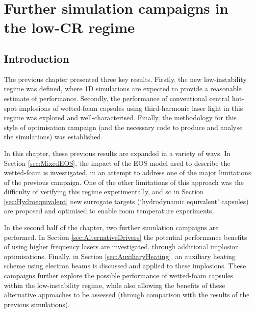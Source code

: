 

\chapter{\label{ch-FurtherSims} Further simulation campaigns in the low-CR regime}

\minitoc

\section{Introduction}
The previous chapter presented three key results. Firstly, the new low-instability regime was defined, where 1D simulations are expected to provide a reasonable estimate of performance. Secondly, the performance of conventional central hot-spot implosions of wetted-foam capsules using third-harmonic laser light in this regime was explored and well-characterised. Finally, the methodology for this style of optimisation campaign (and the necessary code to produce and analyse the simulations) was established.

In this chapter, these previous results are expanded in a variety of ways.  In Section \ref{sec:MixedEOS}, the impact of the EOS model used to describe the wetted-foam is investigated, in an attempt to address one of the major limitations of the previous campaign. One of the other limitations of this approach was the difficulty of verifying this regime experimentally, and so in Section \ref{sec:Hydroequivalent} new surrogate targets (`hydrodynamic equivalent' capsules) are proposed and optimised to enable room temperature experiments.

In the second half of the chapter, two further simulation campaigns are performed. In Section \ref{sec:AlternativeDrivers} the potential performance benefits of using higher frequency lasers are investigated, through additional implosion optimisations. Finally, in Section \ref{sec:AuxiliaryHeating}, an auxiliary heating scheme using electron beams is discussed and applied to these implosions. These campaigns further explore the possible performance of wetted-foam capsules within the low-instability regime, while also allowing the benefits of these alternative approaches to be assessed (through comparison with the results of the previous simulations).

